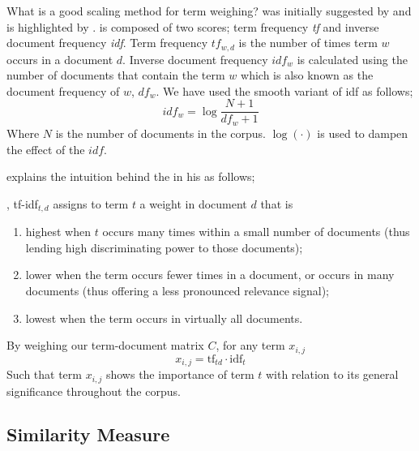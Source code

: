 What is a good scaling method for term weighing?
\tfidf{} was initially suggested by \textcite{jones_statistical_1972} and is highlighted by \textcite{manning_introduction_2009}.
\tfidf{} is composed of two scores; term frequency \emph{tf} and inverse document frequency \emph{idf}.
Term frequency $tf_{w,d}$ is the number of times term $w$ occurs in a document $d$.
Inverse document frequency $idf_{w}$ is calculated using the number of documents that contain the term $w$ which is also known as the document frequency of $w$, $df_w$.
We have used the smooth variant of idf as follows;
\begin{equation}
    idf_w = \log{\frac{N + 1}{df_w + 1}}
\end{equation}
Where $N$ is the number of documents in the corpus. $\log(\cdot)$ is used to dampen the effect of the $idf$.

\citeauthor{manning_introduction_2009} explains the intuition behind the \tfidf{} in his  as follows;
\begin{displayquote}
    \textelp{}, tf-idf$_{t,d}$ assigns to term $t$ a weight in document $d$ that is
    \begin{enumerate}
        \item highest when $t$ occurs many times within a small number of documents (thus lending high discriminating power to those documents);
        \item lower when the term occurs fewer times in a document, or occurs in many documents (thus offering a less pronounced relevance signal);
        \item lowest when the term occurs in virtually all documents.
    \end{enumerate}
\end{displayquote}
By weighing our term-document matrix $C$, for any term $x_{i,j}$
\begin{equation}
x_{i,j} = \text{tf}_{td} \cdot \text{idf}_{t} \end{equation}
Such that term $x_{i,j}$ shows the importance of term $t$ with relation to its general significance throughout the corpus.


\subsection{Similarity Measure}%
\label{sub:similarity_measure}

